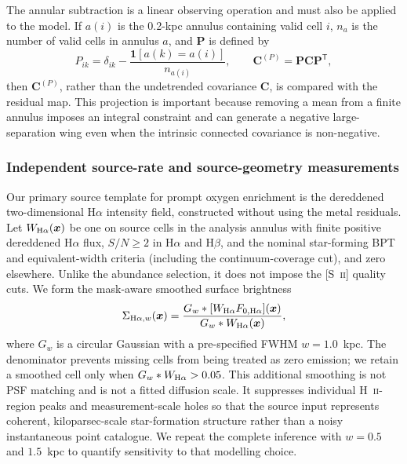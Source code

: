 \documentclass[fleqn,usenatbib]{mnras}
\newcommand{\bs}[1]{\boldsymbol{#1}}
\begin{document}
The annular subtraction is a linear observing operation and must also be applied to the model.  If $a(i)$ is the 0.2-kpc annulus containing valid cell $i$, $n_a$ is the number of valid cells in annulus $a$, and $\mathbf P$ is defined by
\begin{equation}
    P_{ik}=\delta_{ik}
    -\frac{\mathbf{1}[a(k)=a(i)]}{n_{a(i)}},
    \qquad
    \mathbf C^{(P)}=\mathbf P\mathbf C\mathbf P^{\mathsf T},
    \label{eq:phangs_annular_projector}
\end{equation}
then $\mathbf C^{(P)}$, rather than the undetrended covariance $\mathbf C$, is compared with the residual map.  This projection is important because removing a mean from a finite annulus imposes an integral constraint and can generate a negative large-separation wing even when the intrinsic connected covariance is non-negative.

\subsubsection{Independent source-rate and source-geometry measurements}
\label{sssec:phangs_sources}

Our primary source template for prompt oxygen enrichment is the dereddened two-dimensional H$\alpha$ intensity field, constructed without using the metal residuals.  Let $W_{{\rm H}\alpha}(\bs{x})$ be one on source cells in the analysis annulus with finite positive dereddened H$\alpha$ flux, $S/N\geq2$ in H$\alpha$ and H$\beta$, and the nominal star-forming BPT and equivalent-width criteria (including the continuum-coverage cut), and zero elsewhere.  Unlike the abundance selection, it does not impose the [S~\textsc{ii}] quality cuts.  We form the mask-aware smoothed surface brightness
\begin{equation}
    \Sigma_{{\rm H}\alpha,w}(\bs{x})=
    \frac{G_w\ast[W_{{\rm H}\alpha}F_{0,{\rm H}\alpha}](\bs{x})}
    {G_w\ast W_{{\rm H}\alpha}(\bs{x})},
    \label{eq:phangs_halpha_smoothing}
\end{equation}
where $G_w$ is a circular Gaussian with a pre-specified FWHM $w=1.0$~kpc.  The denominator prevents missing cells from being treated as zero emission; we retain a smoothed cell only when $G_w\ast W_{{\rm H}\alpha}>0.05$.  This additional smoothing is not PSF matching and is not a fitted diffusion scale.  It suppresses individual H~\textsc{ii}-region peaks and measurement-scale holes so that the source input represents coherent, kiloparsec-scale star-formation structure rather than a noisy instantaneous point catalogue.  We repeat the complete inference with $w=0.5$ and $1.5$~kpc to quantify sensitivity to that modelling choice.
\end{document}
